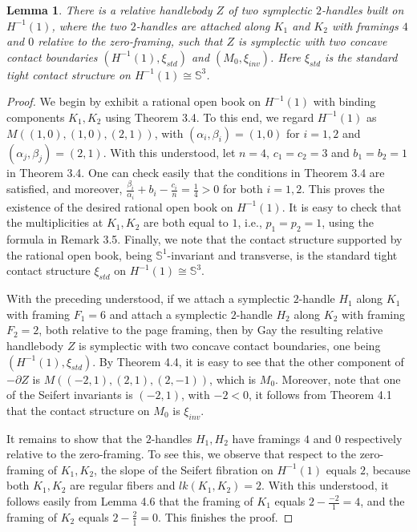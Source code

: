 \documentclass[11pt]{amsart}
\theoremstyle{plain}
\numberwithin{theorem}{section}
\newtheorem{lemma}[theorem]{Lemma}
\theoremstyle{definition}
\newcommand{\s}{{\mathbb S}}
\begin{document}
\begin{lemma}
There is a relative handlebody $Z$ of two symplectic $2$-handles built on $H^{-1}(1)$, where the
two $2$-handles are attached along $K_1$ and $K_2$ with framings $4$ and $0$ relative to the zero-framing, such that $Z$ is symplectic with two concave contact boundaries $(H^{-1}(1), \xi_{std})$ and
$(M_0,\xi_{inv})$. Here $\xi_{std}$ is the standard tight contact structure on $H^{-1}(1)\cong \s^3$. 
\end{lemma}

\begin{proof}
We begin by exhibit a rational open book on $H^{-1}(1)$ with binding components $K_1,K_2$
using Theorem 3.4. To this end, we regard $H^{-1}(1)$ as $M((1,0),(1,0),(2,1))$, with $(\alpha_i,\beta_i)=(1,0)$ for $i=1,2$ and $(\alpha_j,\beta_j)=(2,1)$. With this understood, let $n=4$,
$c_1=c_2=3$ and $b_1=b_2=1$ in Theorem 3.4. One can check easily that the conditions in Theorem 3.4
are satisfied, and moreover, $\frac{\beta_i}{\alpha_i}+b_i-\frac{c_i}{n}=\frac{1}{4}>0$ for both
$i=1,2$. This proves the existence of the desired rational open book on $H^{-1}(1)$. It is
easy to check that the multiplicities at $K_1,K_2$ are both equal to $1$, i.e., $p_1=p_2=1$, using the formula in
Remark 3.5. Finally, we note that the contact structure supported by the rational open book, being $\s^1$-invariant and transverse,  is the standard tight contact structure $\xi_{std}$ on $H^{-1}(1)\cong \s^3$. 

With the preceding understood, if we attach a symplectic $2$-handle $H_1$ along $K_1$ with 
framing $F_1=6$ and attach a symplectic $2$-handle $H_2$ along $K_2$ with framing 
$F_2=2$, both relative to the page framing, then by Gay \cite{G} the resulting relative handlebody $Z$ is symplectic with two concave contact boundaries, one being $(H^{-1}(1), \xi_{std})$. By Theorem 4.4, it is easy to see that the other component of $-\partial Z$ is $M((-2,1),(2,1),(2,-1))$, which is $M_0$. Moreover, note that one of the Seifert invariants is $(-2,1)$, with $-2<0$, it follows from Theorem 4.1 that the contact structure on $M_0$ is $\xi_{inv}$. 

It remains to show that the $2$-handles $H_1,H_2$ have framings $4$ and $0$ respectively 
relative to the zero-framing. To see this, we observe that respect to the zero-framing of $K_1,K_2$,
the slope of the Seifert fibration on $H^{-1}(1)$ equals $2$, because both $K_1,K_2$ are regular
fibers and $lk(K_1,K_2)=2$. With this understood, it follows easily from Lemma 4.6 that the framing of
$K_1$ equals $2-\frac{-2}{1}=4$, and the framing of $K_2$ equals $2-\frac{2}{1}=0$.
This finishes the proof. 
\end{proof}
\end{document}
